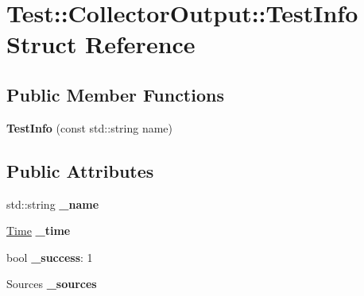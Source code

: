 \hypertarget{struct_test_1_1_collector_output_1_1_test_info}{}\section{Test\+:\+:Collector\+Output\+:\+:Test\+Info Struct Reference}
\label{struct_test_1_1_collector_output_1_1_test_info}
\subsection*{Public Member Functions}
\begin{DoxyCompactItemize}
\item 
{\bfseries Test\+Info} (const std\+::string name)\hypertarget{struct_test_1_1_collector_output_1_1_test_info_acfd49728d424c2824effe37beb85de87}{}\label{struct_test_1_1_collector_output_1_1_test_info_acfd49728d424c2824effe37beb85de87}

\end{DoxyCompactItemize}
\subsection*{Public Attributes}
\begin{DoxyCompactItemize}
\item 
std\+::string {\bfseries \+\_\+name}\hypertarget{struct_test_1_1_collector_output_1_1_test_info_aa28d98e3ea65b4dda28fbb8c62817cf5}{}\label{struct_test_1_1_collector_output_1_1_test_info_aa28d98e3ea65b4dda28fbb8c62817cf5}

\item 
\hyperlink{class_test_1_1_time}{Time} {\bfseries \+\_\+time}\hypertarget{struct_test_1_1_collector_output_1_1_test_info_a59094663d5e7e2a7d896ce574ae6ef1b}{}\label{struct_test_1_1_collector_output_1_1_test_info_a59094663d5e7e2a7d896ce574ae6ef1b}

\item 
bool {\bfseries \+\_\+success}\+: 1\hypertarget{struct_test_1_1_collector_output_1_1_test_info_a99a6450e62566587a15c9ae9b7073ae7}{}\label{struct_test_1_1_collector_output_1_1_test_info_a99a6450e62566587a15c9ae9b7073ae7}

\item 
Sources {\bfseries \+\_\+sources}\hypertarget{struct_test_1_1_collector_output_1_1_test_info_a930eb868ea4e8fb30577967179c80d77}{}\label{struct_test_1_1_collector_output_1_1_test_info_a930eb868ea4e8fb30577967179c80d77}

\end{DoxyCompactItemize}


